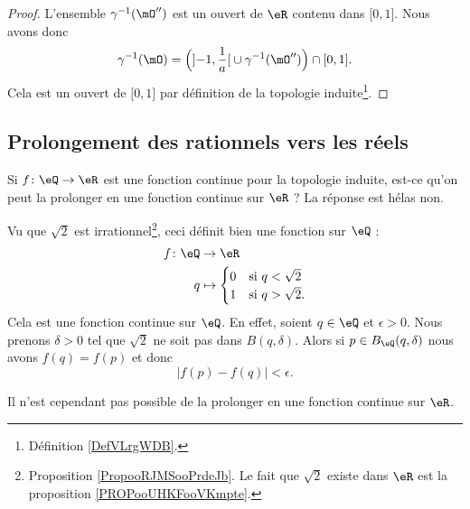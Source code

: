 \begin{proof}
    L'ensemble \( \gamma^{-1}(\mO'')\) est un ouvert de \( \eR\) contenu dans \( \mathopen[ 0 , 1 \mathclose]\). Nous avons donc
    \begin{equation}
    \gamma^{-1}(\mO)=\Big( \mathopen] -1 , \frac{1}{ a } \mathclose[\cup\gamma^{-1}(\mO'') \Big)\cap \mathopen[ 0 , 1 \mathclose].
    \end{equation}
    Cela est un ouvert de \( \mathopen[ 0 , 1 \mathclose]\) par définition de la topologie induite\footnote{Définition \ref{DefVLrgWDB}.}.
\end{proof}

\subsection{Prolongement des rationnels vers les réels}

Si \( f\colon \eQ\to \eR\) est une fonction continue pour la topologie induite, est-ce qu'on peut la prolonger en une fonction continue sur \( \eR\) ? La réponse est hélas non.

\begin{example}       \label{EXooWZNCooQkKdtJ}
    Vu que \( \sqrt{ 2 }\) est irrationnel\footnote{Proposition \ref{PropooRJMSooPrdeJb}. Le fait que $\sqrt{ 2 }$ existe dans \( \eR\) est la proposition \ref{PROPooUHKFooVKmpte}.}, ceci définit bien une fonction sur \( \eQ\) :
    \begin{equation}
        \begin{aligned}
            f\colon \eQ&\to \eR \\
            q&\mapsto \begin{cases}
                0    &   \text{si } q<\sqrt{ 2 }\\
                1    &    \text{si }q>\sqrt{ 2 }.
            \end{cases}
        \end{aligned}
    \end{equation}
    Cela est une fonction continue sur \( \eQ\). En effet, soient \( q\in \eQ\) et \( \epsilon>0\). Nous prenons \( \delta>0\) tel que \( \sqrt{ 2 }\) ne soit pas dans \( B(q,\delta)\). Alors si \( p\in B_{\eQ}(q,\delta)\) nous avons \( f(q)=f(p)\) et donc 
    \begin{equation}
        | f(p)-f(q) |<\epsilon.
    \end{equation}

    Il n'est cependant pas possible de la prolonger en une fonction continue sur \( \eR\).
\end{example}

